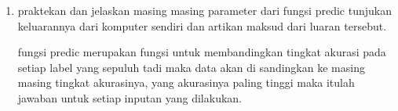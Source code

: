 \begin{enumerate}
\item praktekan dan jelaskan masing masing parameter dari fungsi predic tunjukan keluarannya dari komputer sendiri dan artikan maksud dari luaran tersebut. \par 
\subitem fungsi predic merupakan fungsi untuk membandingkan tingkat akurasi pada setiap label yang sepuluh tadi maka data akan di sandingkan ke masing masing tingkat akurasinya, yang akurasinya paling tinggi maka itulah jawaban untuk setiap inputan yang dilakukan. 


\end{enumerate}


